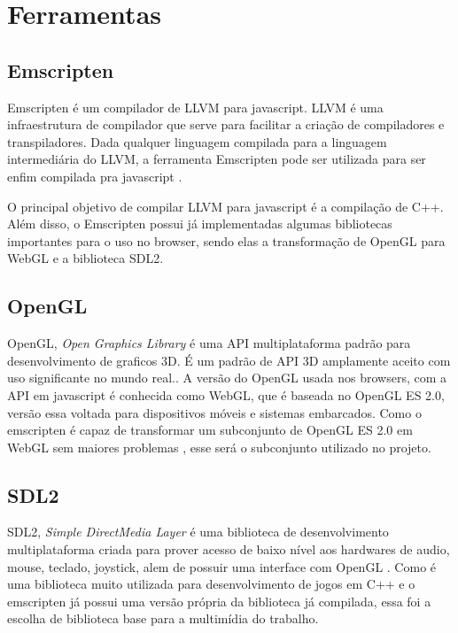 \section{Ferramentas}
\subsection{Emscripten}
Emscripten é um compilador de LLVM para javascript. LLVM é uma infraestrutura de compilador que serve para facilitar a criação de compiladores e transpiladores. Dada qualquer linguagem compilada para a linguagem intermediária do LLVM, a ferramenta Emscripten pode ser utilizada para ser enfim compilada pra javascript \cite{EMSCRIPTEN}.

O principal objetivo de compilar LLVM para javascript é a compilação de C++. Além disso, o Emscripten possui já implementadas algumas bibliotecas importantes para o uso no browser, sendo elas a transformação de OpenGL para WebGL e a biblioteca SDL2.

\subsection{OpenGL}
OpenGL, \textit{Open Graphics Library} é uma API multiplataforma padrão para desenvolvimento de graficos 3D. É um padrão de API 3D amplamente aceito com uso significante no mundo real.\cite{OPENGL}. A versão do OpenGL usada nos browsers, com a API em javascript é conhecida como WebGL, que é baseada no OpenGL ES 2.0, versão essa voltada para dispositivos móveis e sistemas embarcados. Como o emscripten é capaz de transformar um subconjunto de OpenGL ES 2.0 em WebGL sem maiores problemas \cite{EMSCRIPTEN_OPENGL}, esse será o subconjunto utilizado no projeto.

\subsection{SDL2}
SDL2, \textit{Simple DirectMedia Layer} é uma biblioteca de desenvolvimento multiplataforma criada para prover acesso de baixo nível aos hardwares de audio, mouse, teclado, joystick, alem de possuir uma interface com OpenGL \cite{SDL2}. Como é uma biblioteca muito utilizada para desenvolvimento de jogos em C++ e o emscripten já possui uma versão própria da biblioteca já compilada, essa foi a escolha de biblioteca base para a multimídia do trabalho.
